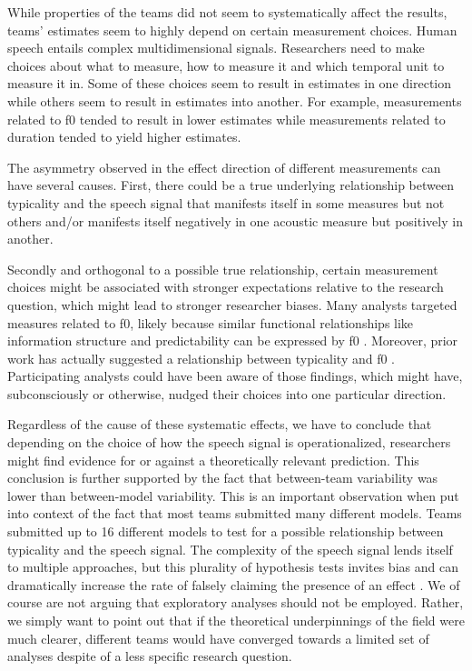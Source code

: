 \documentclass[Review,times,sageh]{sagej}
\begin{document}
While properties of the teams did not seem to systematically affect the results, teams' estimates seem to highly depend on certain measurement choices.
Human speech entails complex multidimensional signals.
Researchers need to make choices about what to measure, how to measure it and which temporal unit to measure it in.
Some of these choices seem to result in estimates in one direction while others seem to result in estimates into another.
For example, measurements related to f0 tended to result in lower estimates while measurements related to duration tended to yield higher estimates.

The asymmetry observed in the effect direction of different measurements can have several causes.
First, there could be a true underlying relationship between typicality and the speech signal that manifests itself in some measures but not others and/or manifests itself negatively in one acoustic measure but positively in another.

Secondly and orthogonal to a possible true relationship, certain measurement choices might be associated with stronger expectations relative to the research question, which might lead to stronger researcher biases.
Many analysts targeted measures related to f0, likely because similar functional relationships like information structure and predictability can be expressed by f0 \citep[e.g.][]{grice2017integrating, turnbull2017role}.
Moreover, prior work has actually suggested a relationship between typicality and f0 \citep[e.g.][]{dimitrova2008prosodic, dimitrova2009did}.
Participating analysts could have been aware of those findings, which might have, subconsciously or otherwise, nudged their choices into one particular direction.

Regardless of the cause of these systematic effects, we have to conclude that depending on the choice of how the speech signal is operationalized, researchers might find evidence for or against a theoretically relevant prediction.
This conclusion is further supported by the fact that between-team variability was lower than between-model variability.
This is an important observation when put into context of the fact that most teams submitted many different models.
Teams submitted up to 16 different models to test for a possible relationship between typicality and the speech signal.
The complexity of the speech signal lends itself to multiple approaches, but this plurality of hypothesis tests invites bias and can dramatically increase the rate of falsely claiming the presence of an effect \citep{roettger2019researcher, simmons2011false}.
We of course are not arguing that exploratory analyses should not be employed.
Rather, we simply want to point out that if the theoretical underpinnings of the field were much clearer, different teams would have converged towards a limited set of analyses despite of a less specific research question.
\end{document}
